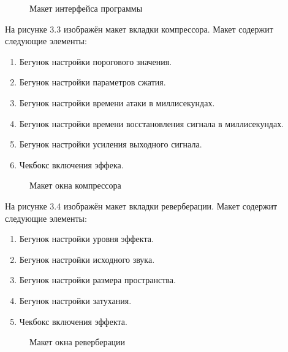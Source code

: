 \begin{figure}[ht]
	\center{\texttt{[image: 1]}}
	\caption{Макет интерфейса программы}
	\label{1:image}
\end{figure}
\clearpage

На рисунке 3.3 изображён макет вкладки компрессора. Макет содержит следующие элементы:
\begin{enumerate}
	\item Бегунок настройки порогового значения.
	\item Бегунок настройки параметров сжатия.
	\item Бегунок настройки времени атаки в миллисекундах.
	\item Бегунок настройки времени восстановления сигнала в миллисекундах.
	\item Бегунок настройки усиления выходного сигнала.
	\item Чекбокс включения эффека.
\end{enumerate}

\begin{figure}[ht]
	\center{\texttt{[image: 2]}}
	\caption{Макет окна компрессора}
	\label{2:image}
\end{figure}

На рисунке 3.4 изображён макет вкладки реверберации. Макет содержит следующие элементы:
\begin{enumerate}
	\item Бегунок настройки уровня эффекта.
	\item Бегунок настройки исходного звука.
	\item Бегунок настройки размера пространства.
	\item Бегунок настройки затухания.
	\item Чекбокс включения эффекта.
\end{enumerate}

\begin{figure}[ht]
	\center{\texttt{[image: 3]}}
	\caption{Макет окна реверберации}
	\label{3:image}
\end{figure}
\clearpage